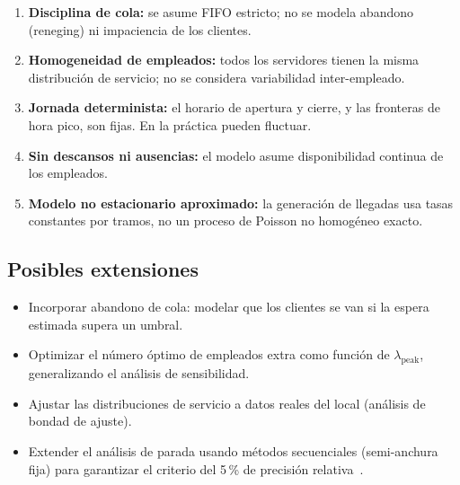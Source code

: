 \begin{enumerate}
  \item \textbf{Disciplina de cola:} se asume FIFO estricto; no se modela
    abandono (reneging) ni impaciencia de los clientes.
  \item \textbf{Homogeneidad de empleados:} todos los servidores tienen la
    misma distribución de servicio; no se considera variabilidad inter-empleado.
  \item \textbf{Jornada determinista:} el horario de apertura y cierre, y las
    fronteras de hora pico, son fijas.
    En la práctica pueden fluctuar.
  \item \textbf{Sin descansos ni ausencias:} el modelo asume disponibilidad
    continua de los empleados.
  \item \textbf{Modelo no estacionario aproximado:} la generación de llegadas
    usa tasas constantes por tramos, no un proceso de Poisson no homogéneo
    exacto.
\end{enumerate}

\subsection{Posibles extensiones}

\begin{itemize}
  \item Incorporar abandono de cola: modelar que los clientes se van si
    la espera estimada supera un umbral.
  \item Optimizar el número óptimo de empleados extra como función de
    $\lambda_{\text{peak}}$, generalizando el análisis de sensibilidad.
  \item Ajustar las distribuciones de servicio a datos reales del local
    (análisis de bondad de ajuste).
  \item Extender el análisis de parada usando métodos secuenciales
    (semi-anchura fija) para garantizar el criterio del 5\,\% de precisión
    relativa~\citep{law2015simulation}.
\end{itemize}
